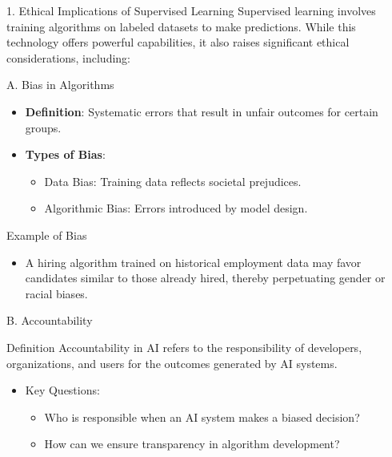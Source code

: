 \documentclass[aspectratio=169]{beamer}
\begin{document}
\begin{frame}[fragile]{1. Ethical Implications of Supervised Learning}
    Supervised learning involves training algorithms on labeled datasets to make predictions. While this technology offers powerful capabilities, it also raises significant ethical considerations, including:
    
    \begin{block}{A. Bias in Algorithms}
        \begin{itemize}
            \item \textbf{Definition}: Systematic errors that result in unfair outcomes for certain groups.
            \item \textbf{Types of Bias}:
                \begin{itemize}
                    \item Data Bias: Training data reflects societal prejudices.
                    \item Algorithmic Bias: Errors introduced by model design.
                \end{itemize}
        \end{itemize}
    \end{block}
\end{frame}

\begin{frame}[fragile]{Example of Bias}
    \begin{itemize}
        \item A hiring algorithm trained on historical employment data may favor candidates similar to those already hired, thereby perpetuating gender or racial biases.
    \end{itemize}
\end{frame}

\begin{frame}[fragile]{B. Accountability}
    \begin{block}{Definition}
        Accountability in AI refers to the responsibility of developers, organizations, and users for the outcomes generated by AI systems.
    \end{block}
    \begin{itemize}
        \item Key Questions:
            \begin{itemize}
                \item Who is responsible when an AI system makes a biased decision?
                \item How can we ensure transparency in algorithm development?
            \end{itemize}
    \end{itemize}
\end{frame}
\end{document}

